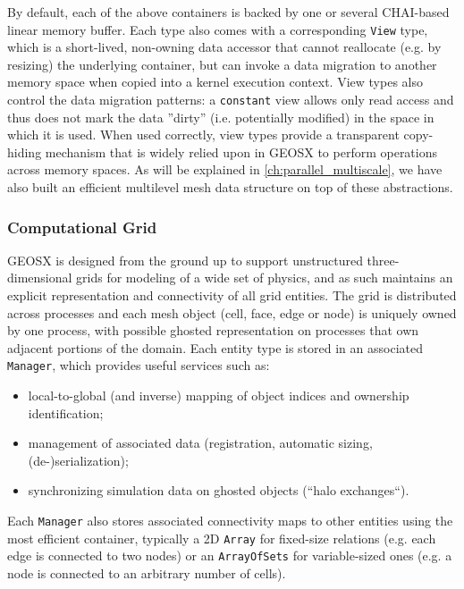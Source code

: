 By default, each of the above containers is backed by one or several CHAI-based linear memory buffer.   Each type also comes with a corresponding \texttt{View} type, which is a short-lived, non-owning data accessor that cannot reallocate (e.g. by resizing) the underlying container, but can invoke a data migration to another memory space when copied into a kernel execution context.   View types also control the data migration patterns: a \texttt{constant} view allows only read access and thus does not mark the data ''dirty'' (i.e. potentially modified) in the space in which it is used.   When used correctly, view types provide a transparent copy-hiding mechanism that is widely relied upon in GEOSX to perform operations across memory spaces.   As will be explained in \cref{ch:parallel_multiscale}, we have also built an efficient multilevel mesh data structure on top of these abstractions.

\subsubsection{Computational Grid}

GEOSX is designed from the ground up to support unstructured three-dimensional grids for modeling of a wide set of physics, and as such maintains an explicit representation and connectivity of all grid entities.   The grid is distributed across processes and each mesh object (cell, face, edge or node) is uniquely owned by one process, with possible ghosted representation on processes that own adjacent portions of the domain.   Each entity type is stored in an associated \texttt{Manager}, which provides useful services such as:
\begin{itemize}
    \item local-to-global (and inverse) mapping of object indices and ownership identification;
    \item management of associated data (registration, automatic sizing, (de-)serialization);
    \item synchronizing simulation data on ghosted objects (``halo exchanges``).
\end{itemize}
Each \texttt{Manager} also stores associated connectivity maps to other entities using the most efficient container, typically a 2D \texttt{Array} for fixed-size relations (e.g. each edge is connected to two nodes) or an \texttt{ArrayOfSets} for variable-sized ones (e.g. a node is connected to an arbitrary number of cells). 


